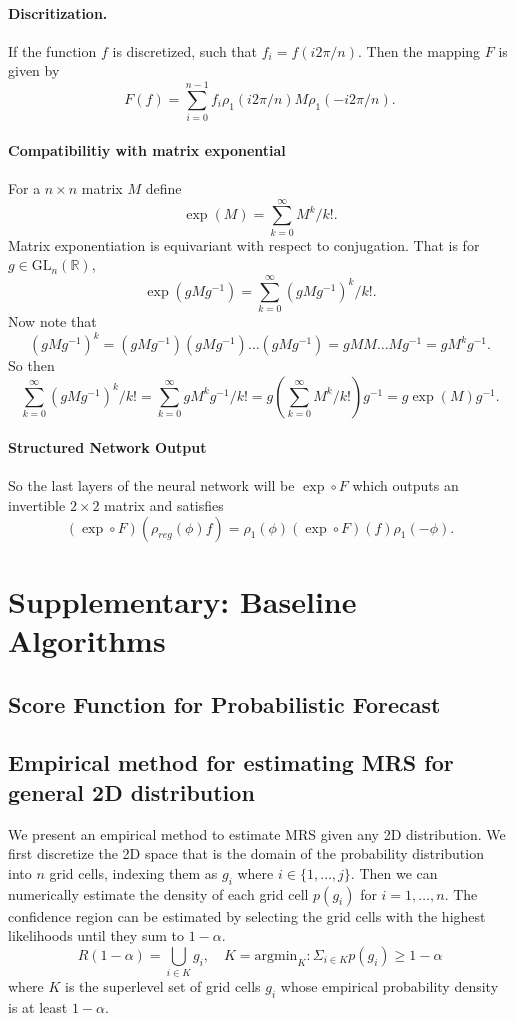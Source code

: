 \paragraph{Discritization.}
If the function $f$ is discretized, such that $f_i = f(i2\pi/n)$.  Then the mapping $F$ is given by 
\[
F(f) = \sum_{i=0}^{n-1} f_i \rho_1(i2\pi/n) M \rho_1(-i2\pi/n).
\]

\paragraph{Compatibilitiy with matrix exponential}

For a $n \times n$ matrix $M$ define 
\[
\exp(M) = \sum_{k=0}^\infty M^k/k!.
\]
Matrix exponentiation is equivariant with respect to conjugation.  That is for $g \in \mathrm{GL}_n(\mathbb{R})$, 
\[
\exp(gMg^{-1}) = \sum_{k=0}^\infty (gMg^{-1})^k/k!. 
\]
Now note that
\[
(gMg^{-1})^k = (gMg^{-1}) (gMg^{-1}) \ldots (gMg^{-1}) = gMM \ldots Mg^{-1} = g M^k g^{-1}.
\]
So then 
\[
\sum_{k=0}^\infty (gMg^{-1})^k/k! = \sum_{k=0}^\infty gM^kg^{-1}/k! = g \left( \sum_{k=0}^\infty M^k/k! \right) g^{-1} = g \exp(M) g^{-1}.
\]

\paragraph{Structured Network Output}

So the last layers of the neural network will be $\exp \circ F$ which outputs an invertible $2 \times 2$ matrix and satisfies 
\[
(\exp \circ F)(\rho_{reg}(\phi) f) = \rho_1(\phi) (\exp \circ F)(f) \rho_1(-\phi).
\]


\section{Supplementary: Baseline Algorithms}

\subsection{Score Function for Probabilistic Forecast}


\subsection{Empirical method for estimating MRS for general 2D distribution }
\label{app:mrsgeneral}

We present an empirical method to estimate MRS given any 2D distribution. We first discretize the 2D space that is the domain of the probability distribution into $n$ grid cells, indexing them as $g_i$ where $i\in \{1,\ldots,j\}$. Then we can numerically estimate the density of each grid cell $p(g_i)$ for $i= 1,\ldots,n$. The confidence region can be estimated by selecting the grid cells with the highest likelihoods until they sum to $1-\alpha$. 
\[
R(1-\alpha) = \bigcup_{i\in K} g_i, \quad K =  \text{argmin}_K: \Sigma_{i\in K} p(g_i) \geq 1-\alpha
\]
where $K$ is the superlevel set of grid cells $g_i$ whose empirical probability density is at least  $1-\alpha$.


